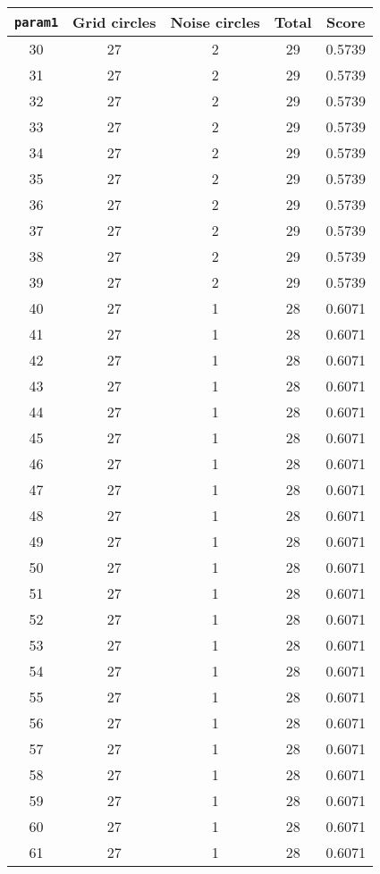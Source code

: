 \documentclass[letterpaper, 12pt]{article}
\begin{document}
\begin{longtable}{|c|c|c|c|c|}
\hline
\textbf{\texttt{param1}} & \textbf{Grid circles} & \textbf{Noise circles} & \textbf{Total} & \textbf{Score} \\
\hline
30 & 27 & 2 & 29 & 0.5739 \\
\hline
31 & 27 & 2 & 29 & 0.5739 \\
\hline
32 & 27 & 2 & 29 & 0.5739 \\
\hline
33 & 27 & 2 & 29 & 0.5739 \\
\hline
34 & 27 & 2 & 29 & 0.5739 \\
\hline
35 & 27 & 2 & 29 & 0.5739 \\
\hline
36 & 27 & 2 & 29 & 0.5739 \\
\hline
37 & 27 & 2 & 29 & 0.5739 \\
\hline
38 & 27 & 2 & 29 & 0.5739 \\
\hline
39 & 27 & 2 & 29 & 0.5739 \\
\hline
40 & 27 & 1 & 28 & 0.6071 \\
\hline
41 & 27 & 1 & 28 & 0.6071 \\
\hline
42 & 27 & 1 & 28 & 0.6071 \\
\hline
43 & 27 & 1 & 28 & 0.6071 \\
\hline
44 & 27 & 1 & 28 & 0.6071 \\
\hline
45 & 27 & 1 & 28 & 0.6071 \\
\hline
46 & 27 & 1 & 28 & 0.6071 \\
\hline
47 & 27 & 1 & 28 & 0.6071 \\
\hline
48 & 27 & 1 & 28 & 0.6071 \\
\hline
49 & 27 & 1 & 28 & 0.6071 \\
\hline
50 & 27 & 1 & 28 & 0.6071 \\
\hline
51 & 27 & 1 & 28 & 0.6071 \\
\hline
52 & 27 & 1 & 28 & 0.6071 \\
\hline
53 & 27 & 1 & 28 & 0.6071 \\
\hline
54 & 27 & 1 & 28 & 0.6071 \\
\hline
55 & 27 & 1 & 28 & 0.6071 \\
\hline
56 & 27 & 1 & 28 & 0.6071 \\
\hline
57 & 27 & 1 & 28 & 0.6071 \\
\hline
58 & 27 & 1 & 28 & 0.6071 \\
\hline
59 & 27 & 1 & 28 & 0.6071 \\
\hline
60 & 27 & 1 & 28 & 0.6071 \\
\hline
61 & 27 & 1 & 28 & 0.6071 \\

\end{longtable}
\end{document}
